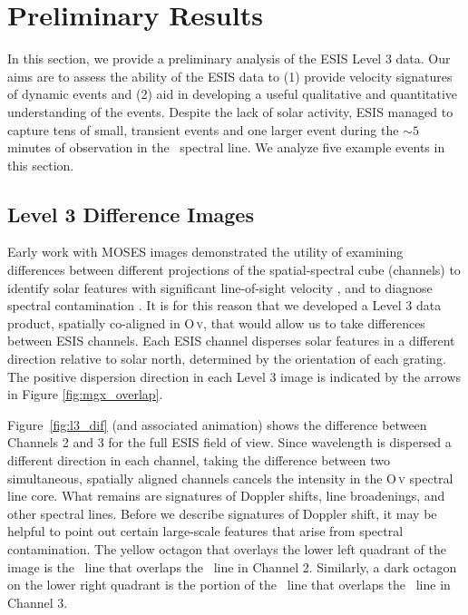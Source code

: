 \section{Preliminary Results}
 
	   In this section, we provide a preliminary analysis of the ESIS Level 3 data. Our aims are to assess the ability of the ESIS data to (1) provide velocity signatures of dynamic events and (2) aid in developing a useful qualitative and quantitative understanding of the events.
	   Despite the lack of solar activity, ESIS managed to capture tens of small, transient events and one larger event during the $\sim 5$ minutes of observation in the \ov \ spectral line.  
	   We analyze five example events in this section.  
	   
    \subsection{Level 3 Difference Images} \label{sec:dif_images} 
    	Early work with MOSES images demonstrated the utility of examining differences between different projections of the spatial-spectral cube (channels) to identify solar features with significant line-of-sight velocity \citep{Fox2010,Fox2011,Rust2017,Rust2019}, and to diagnose spectral contamination \citep{Rust2017, Rust2019}.
    	It is for this reason that we developed a Level 3 data product, spatially co-aligned in O\,\textsc{v}, that would allow us to take differences between ESIS channels.
    	Each ESIS channel disperses solar features in a different direction relative to solar north, determined by the orientation of each grating.
    	The positive dispersion direction in each Level 3 image is indicated by the arrows in Figure \ref{fig:mgx_overlap}.
    	
    	Figure~\ref{fig:l3_dif} (and associated animation) shows the difference between Channels 2 and 3 for the full ESIS field of view.  
    	Since wavelength is dispersed a different direction in each channel, taking the difference between two
    	simultaneous, spatially aligned channels cancels the intensity in the O\,\textsc{v} spectral line core. 
    	What remains are signatures of Doppler shifts, line broadenings, and other spectral lines.
    	Before we describe signatures of Doppler shift, it may be helpful to point out certain large-scale features that arise from spectral contamination.
    	The %
    	yellow octagon that overlays the lower left quadrant of the image is the \mgxbright \ line that overlaps the \ov \ line in Channel 2. Similarly, a dark octagon on the lower right quadrant is the portion of the \mgxbright \ line that overlaps the \ov \ line in Channel 3.
    	
